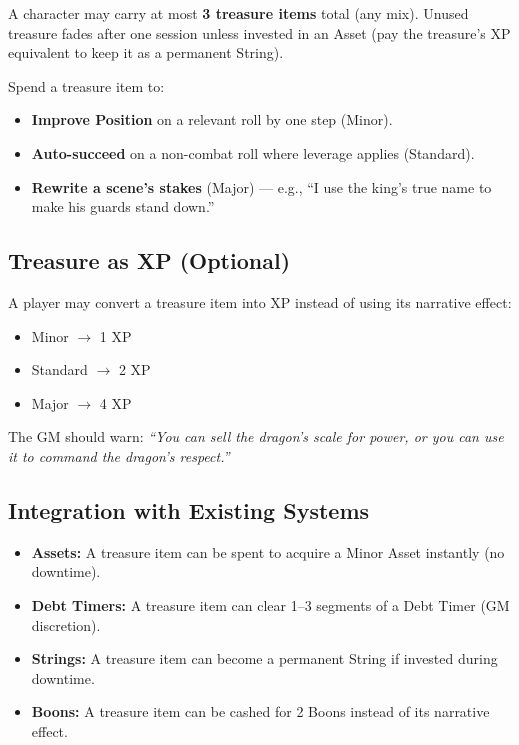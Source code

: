 A character may carry at most \textbf{3 treasure items} total (any mix). Unused treasure fades after one session unless invested in an Asset (pay the treasure's XP equivalent to keep it as a permanent String).

Spend a treasure item to:

\begin{itemize}
  \item \textbf{Improve Position} on a relevant roll by one step (Minor).
  \item \textbf{Auto-succeed} on a non-combat roll where leverage applies (Standard).
  \item \textbf{Rewrite a scene's stakes} (Major) --- e.g., ``I use the king's true name to make his guards stand down.''
\end{itemize}

\subsection{Treasure as XP (Optional)}
\label{subsec:treasure-as-xp}

A player may convert a treasure item into XP instead of using its narrative effect:

\begin{itemize}
  \item Minor $\rightarrow$ 1 XP
  \item Standard $\rightarrow$ 2 XP
  \item Major $\rightarrow$ 4 XP
\end{itemize}

The GM should warn: \emph{``You can sell the dragon's scale for power, or you can use it to command the dragon's respect.''}

\subsection{Integration with Existing Systems}
\label{subsec:treasure-integration}

\begin{itemize}
  \item \textbf{Assets:} A treasure item can be spent to acquire a Minor Asset instantly (no downtime).
  \item \textbf{Debt Timers:} A treasure item can clear 1--3 segments of a Debt Timer (GM discretion).
  \item \textbf{Strings:} A treasure item can become a permanent String if invested during downtime.
  \item \textbf{Boons:} A treasure item can be cashed for 2 Boons instead of its narrative effect.
\end{itemize}

